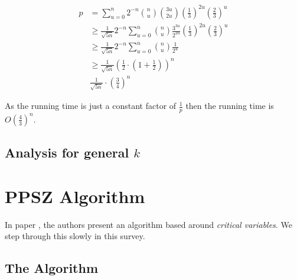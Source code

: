 \documentclass[12pt, a4paper]{article}
\theoremstyle{definition}
\begin{document}
\begin{align}
	p 	&= \sum_{u = 0}^{n} 2^{-n} \binom{n}{u} \binom{3u}{2u} \left( \frac{1}{3} \right)^{2u} \left( \frac{2}{3} \right)^u \\
	 	&\geq \frac{1}{\sqrt{5n}} 2^{-n}\sum_{u = 0}^{n} \binom{n}{u} \frac{3^{3u}}{2^{2u}} \left( \frac{1}{3} \right)^{2u} \left( \frac{2}{3} \right)^u \\
	 	&\geq \frac{1}{\sqrt{5n}} 2^{-n}\sum_{u = 0}^{n} \binom{n}{u} \frac{1}{2^u} \\
	 	&\geq \frac{1}{\sqrt{5n}} \left(\frac{1}{2} \cdot \left(1 + \frac{1}{2} \right) \right)^n \\
	 	& \frac{1}{\sqrt{5n}} \cdot \left( \frac{3}{4} \right)^n
\end{align}

As the running time is just a constant factor of $\frac{1}{p}$ then the running time is $O\left(\frac{4}{3} \right)^n$.
	
\subsection{Analysis for general $k$}

\section{PPSZ Algorithm}

In paper \cite{paturi98an-improved}, the authors present an algorithm based around \textit{critical variables}. We step through this slowly in this survey. 

\subsection{The Algorithm}






\end{document}
